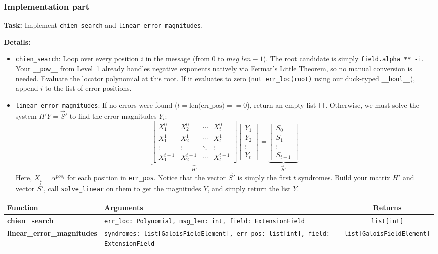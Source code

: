 \subsubsection*{Implementation part}
\textbf{Task:} Implement \lstinline|chien_search| and \lstinline|linear_error_magnitudes|.

\textbf{Details:} 
\begin{itemize}
    \item \lstinline|chien_search|: Loop over every position $i$ in the message (from $0$ to $msg\_len - 1$). The root candidate is simply \lstinline|field.alpha ** -i|. Your \lstinline|__pow__| from Level~1 already handles negative exponents natively via Fermat's Little Theorem, so no manual conversion is needed. Evaluate the locator polynomial at this root. If it evaluates to zero (\lstinline|not err_loc(root)| using our duck-typed \lstinline|__bool__|), append $i$ to the list of error positions.
    \item \lstinline|linear_error_magnitudes|: If no errors were found ($t = \text{len(err\_pos)} == 0$), return an empty list \lstinline|[]|. Otherwise, we must solve the system $H' Y = \vec{S}'$ to find the error magnitudes $Y_i$:
\[
\underbrace{
\begin{bmatrix}
X_1^0 & X_2^0 & \cdots & X_t^0 \\
X_1^1 & X_2^1 & \cdots & X_t^1 \\
\vdots & \vdots & \ddots & \vdots \\
X_1^{t-1} & X_2^{t-1} & \cdots & X_t^{t-1}
\end{bmatrix}
}_{H'}
\begin{bmatrix}
Y_1 \\
Y_2 \\
\vdots \\
Y_t
\end{bmatrix}
=
\underbrace{
\begin{bmatrix}
S_0 \\
S_1 \\
\vdots \\
S_{t-1}
\end{bmatrix}
}_{\vec{S}'}
\]
Here, $X_i = \alpha^{pos_i}$ for each position in \lstinline|err_pos|. Notice that the vector $\vec{S}'$ is simply the first $t$ syndromes. Build your matrix $H'$ and vector $\vec{S}'$, call \lstinline|solve_linear| on them to get the magnitudes $Y$, and simply return the list $Y$.
\end{itemize}

\begin{center}
\renewcommand{\arraystretch}{1.5}
\begin{tabularx}{\textwidth}{@{} >{\bfseries}l X c @{}}
\toprule
Function & Arguments & Returns \\ \midrule
chien\_search & \lstinline|err_loc: Polynomial, msg_len: int, field: ExtensionField| & \lstinline|list[int]| \\
linear\_error\_magnitudes & \lstinline|syndromes: list[GaloisFieldElement], err_pos: list[int], field: ExtensionField| & \lstinline|list[GaloisFieldElement]| \\
\bottomrule
\end{tabularx}
\end{center}


